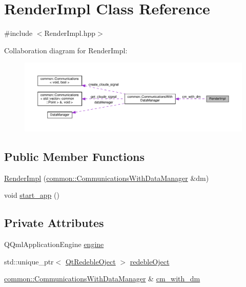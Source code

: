 \hypertarget{classRenderImpl}{}\section{Render\+Impl Class Reference}
\label{classRenderImpl}


{\ttfamily \#include $<$Render\+Impl.\+hpp$>$}



Collaboration diagram for Render\+Impl\+:
\nopagebreak
\begin{figure}[H]
\begin{center}
\leavevmode
\includegraphics[width=350pt]{classRenderImpl__coll__graph}
\end{center}
\end{figure}
\subsection*{Public Member Functions}
\begin{DoxyCompactItemize}
\item 
\mbox{\hyperlink{classRenderImpl_a61398c59a9a3f283252b8b7856c85557}{Render\+Impl}} (\mbox{\hyperlink{classcommon_1_1CommunicationsWithDataManager}{common\+::\+Communications\+With\+Data\+Manager}} \&dm)
\item 
void \mbox{\hyperlink{classRenderImpl_a9275df6cdd264125ffa3a7536ebc2fec}{start\+\_\+app}} ()
\end{DoxyCompactItemize}
\subsection*{Private Attributes}
\begin{DoxyCompactItemize}
\item 
Q\+Qml\+Application\+Engine \mbox{\hyperlink{classRenderImpl_a8ccd71e00c0f76702d9bb0f0e40a1ccb}{engine}}
\item 
std\+::unique\+\_\+ptr$<$ \mbox{\hyperlink{classQtRedebleOject}{Qt\+Redeble\+Oject}} $>$ \mbox{\hyperlink{classRenderImpl_a40cf893cd17cc6c94072ce79fc765bf1}{redeble\+Oject}}
\item 
\mbox{\hyperlink{classcommon_1_1CommunicationsWithDataManager}{common\+::\+Communications\+With\+Data\+Manager}} \& \mbox{\hyperlink{classRenderImpl_ad1fb1f788f5b06cc60d6f946ccc44273}{cm\+\_\+with\+\_\+dm}}
\end{DoxyCompactItemize}



